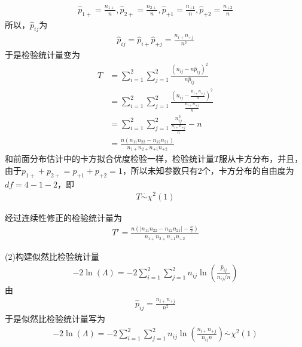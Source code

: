             \begin{align*}
            \hat{p}_{1+} = \frac{n_{1+}}{n},\hat{p}_{2+} = \frac{n_{2+}}{n},\hat{p}_{+1} = \frac{n_{+1}}{n},\hat{p}_{+2} = \frac{n_{+2}}{n}
            \end{align*}
            所以，$\hat{p}_{ij}$为
            \begin{align*}
            \hat{p}_{ij} = \hat{p}_{i+}\hat{p}_{+j} = \frac{n_{i+}n_{+j}}{n^2}
            \end{align*}
            于是检验统计量变为
            \begin{align*}
            T &=\sum_{i=1}^2\sum_{j=1}^2\frac{(n_{ij} - n\hat{p}_{ij})^2}{n\hat{p}_{ij}}\\
            &=\sum_{i=1}^2\sum_{j=1}^2\frac{\left(n_{ij} - \frac{n_{i+}n_{+j}}{n}\right)^2}{\frac{n_{i+}n_{+j}}{n}}\\
            &=\sum_{i=1}^2\sum_{j=1}^2 \frac{n_{ij}^2}{\frac{n_{i+}n_{+j}}{n}} - n\\
            &=\frac{n(n_{11}n_{22} - n_{12}n_{21})}{n_{1+}n_{2+}n_{+1}n_{+2}}
            \end{align*}
            和前面分布估计中的卡方拟合优度检验一样，检验统计量$T$服从卡方分布，并且，由于$p_{1+}+p_{2+} = p_{+1}+p_{+2} = 1$，所以未知参数只有2个，卡方分布的自由度为$df = 4-1-2$，即
            \begin{align*}
            T \overset{\cdot}{\sim} \chi^2(1)
            \end{align*}
            \par
            经过连续性修正的检验统计量为
            \begin{align*}
            T' = \frac{n\left(|n_{11}n_{22} - n_{12}n_{21}|-\frac n2\right)}{n_{1+}n_{2+}n_{+1}n_{+2}}
            \end{align*}
            \par
            (2)构建似然比检验统计量
            \begin{align*}
            -2\ln (\varLambda) = -2\sum_{i=1}^2\sum_{j=1}^2n_{ij}\ln \left( \frac{\hat{p}_{ij}}{n_{ij}/n} \right)
            \end{align*}
            由
            \begin{align*}
            \hat{p}_{ij} = \frac{n_{i+}n_{+j}}{n^2}
            \end{align*}
            于是似然比检验统计量写为
            \begin{align*}
            -2\ln (\varLambda) = -2\sum_{i=1}^2\sum_{j=1}^2n_{ij}\ln \left( \frac{n_{i+}n_{+j}}{n_{ij}n} \right) \overset{\cdot}{\sim}\chi^2(1)
            \end{align*}
